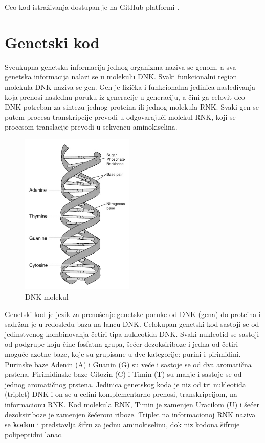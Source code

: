 \documentclass[a4paper,12pt]{article}
\begin{document}
Ceo kod istraživanja dostupan je na GitHub platformi \cite{github_link1, github_link2}.


\newpage
\section{Genetski kod}
Sveukupna genetska informacija jednog organizma naziva se genom, a sva genetska informacija nalazi se u molekulu DNK. Svaki funkcionalni region molekula DNK naziva se gen. Gen je fizička i funkcionalna jedinica nasleđivanja koja prenosi naslednu poruku iz generacije u generaciju, a čini ga celovit deo DNK potreban za sintezu jednog proteina ili jednog molekula RNK. Svaki gen se putem procesa transkripcije prevodi u odgovarajući molekul RNK, koji se procesom translacije prevodi u sekvencu aminokiselina.

\begin{figure}
    \hspace{-1.1cm}
    \vspace{-0.3cm}
  \centering
  \includegraphics[width=0.48\textwidth]{slika1.jpeg}
  \caption{DNK molekul}
\end{figure}

\bigskip
Genetski kod je jezik za prenošenje genetske poruke od DNK (gena) do proteina i sadržan je u redosledu baza na lancu DNK. Celokupan genetski kod sastoji se od jedinstvenog kombinovanja četiri tipa nukleotida DNK. Svaki nukleotid se sastoji od podgrupe koju čine fosfatna grupa, šećer dezoksiriboze i jedna od četiri moguće azotne baze, koje su grupisane u dve kategorije: purini i pirimidini. Purinske baze Adenin (A) i Guanin (G) su veće i sastoje se od dva aromatična prstena. Pirimidinske baze Citozin (C) i Timin (T) su manje i sastoje se od jednog aromatičnog prstena. Jedinica genetskog koda je niz od tri nukleotida (triplet) DNK i on se u celini komplementarno prenosi, transkripcijom, na informacionu RNK. Kod molekula RNK, Timin je zamenjen Uracilom (U) i šećer dezoksiriboze je zamenjen šećerom riboze. Triplet na informacionoj RNK naziva se \textbf{kodon} i predstavlja šifru za jednu aminokiselinu, dok niz kodona šifruje polipeptidni lanac.
\end{document}
